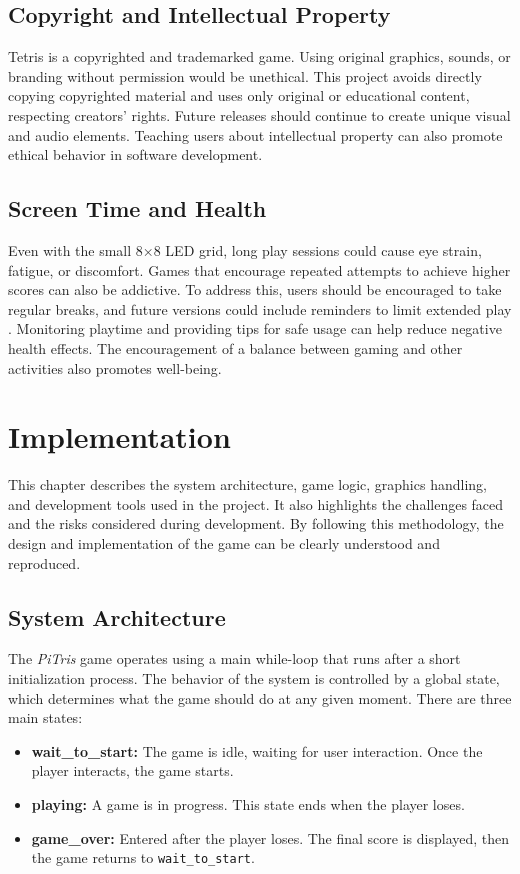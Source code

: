 \documentclass[11pt,titlepage,openright]{book}
\begin{document}
\section{Copyright and Intellectual Property}
Tetris is a copyrighted and trademarked game. Using original graphics, sounds, or branding without permission would be unethical. This project avoids directly copying copyrighted material and uses only original or educational content, respecting creators’ rights. Future releases should continue to create unique visual and audio elements. Teaching users about intellectual property can also promote ethical behavior in software development.

\section{Screen Time and Health}
Even with the small 8×8 LED grid, long play sessions could cause eye strain, fatigue, or discomfort. Games that encourage repeated attempts to achieve higher scores can also be addictive. To address this, users should be encouraged to take regular breaks, and future versions could include reminders to limit extended play \cite{Ferguson2017}. Monitoring playtime and providing tips for safe usage can help reduce negative health effects. The encouragement of a balance between gaming and other activities also promotes well-being.

\chapter{Implementation}
This chapter describes the system architecture, game logic, graphics handling, and development tools used in the project. It also highlights the challenges faced and the risks considered during development. By following this methodology, the design and implementation of the game can be clearly understood and reproduced.

\section{System Architecture}
The \textit{PiTris} game operates using a main while-loop that runs after a short initialization process. The behavior of the system is controlled by a global state, which determines what the game should do at any given moment. There are three main states:

\begin{itemize}
    \item \textbf{wait\_to\_start:} The game is idle, waiting for user interaction. Once the player interacts, the game starts.
    \item \textbf{playing:} A game is in progress. This state ends when the player loses.
    \item \textbf{game\_over:} Entered after the player loses. The final score is displayed, then the game returns to \texttt{wait\_to\_start}.
\end{itemize}
\end{document}
